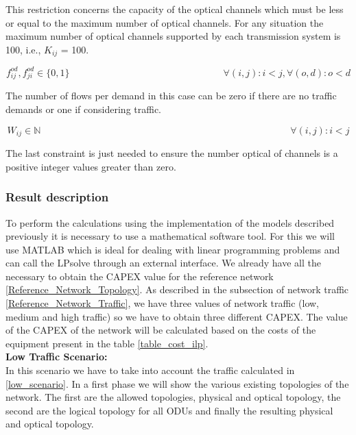 This restriction concerns the capacity of the optical channels which must be less or equal to the maximum number of optical channels. For any situation the maximum number of optical channels supported by each transmission system is 100, i.e., $K_{ij}$ = 100.

\begin{equation}
f_{ij}^{od} , f_{ji}^{od} \in \{0,1\}   \qquad \qquad \qquad \qquad \qquad \qquad \qquad \qquad
\forall(i,j) : i < j, \forall(o,d) : o < d
\label{ILPOpaque6_Surv}
\end{equation}

The number of flows per demand in this case can be zero if there are no traffic demands or one if considering traffic.

\begin{equation}
W_{ij} \in \mathbb{N}  \qquad \qquad \qquad \qquad \qquad \qquad \qquad \qquad \qquad \qquad \qquad \qquad \qquad
\forall(i,j) : i < j
\label{ILPOpaque7_Surv}
\end{equation}

The last constraint is just needed to ensure the number optical of channels is a positive integer values greater than zero.


\subsubsection{Result description}

To perform the calculations using the implementation of the models described previously it is necessary to use a mathematical software tool. For this we will use MATLAB which is ideal for dealing with linear programming problems and can call the LPsolve through an external interface.
We already have all the necessary to obtain the CAPEX value for the reference network \ref{Reference_Network_Topology}. As described in the subsection of network traffic \ref{Reference_Network_Traffic}, we have three values of network traffic (low, medium and high traffic) so we have to obtain three different CAPEX.
The value of the CAPEX of the network will be calculated based on the costs of the equipment present in the table \ref{table_cost_ilp}.\\


\textbf{Low Traffic Scenario:}\\

In this scenario we have to take into account the traffic calculated in \ref{low_scenario}. In a first phase we will show the various existing topologies of the network. The first are the allowed topologies, physical and optical topology, the second are the logical topology for all ODUs and finally the resulting physical and optical topology.\\

